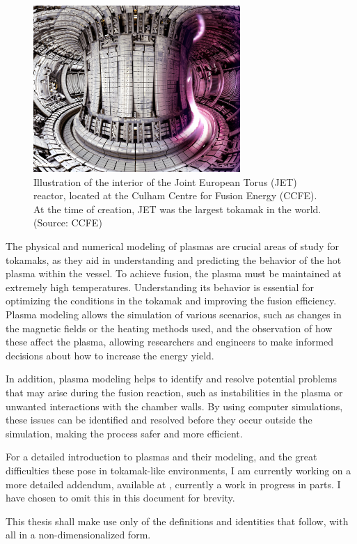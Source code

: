     \begin{figure}[!ht]
        \centering
        \includegraphics[width = 0.7\textwidth]{0 - introduction/images/JET.jpg}
        \caption{Illustration of the interior of the Joint European Torus (JET) reactor, located at the Culham Centre for Fusion Energy (CCFE). At the time of creation, JET was the largest tokamak in the world. (Source: CCFE)}
    \end{figure}

    \shortline

    The physical and numerical modeling of plasmas are crucial areas of study for tokamaks, as they aid in understanding and predicting the behavior of the hot plasma within the vessel. To achieve fusion, the plasma must be maintained at extremely high temperatures. Understanding its behavior is essential for optimizing the conditions in the tokamak and improving the fusion efficiency. Plasma modeling allows the simulation of various scenarios, such as changes in the magnetic fields or the heating methods used, and the observation of how these affect the plasma, allowing researchers and engineers to make informed decisions about how to increase the energy yield.

    In addition, plasma modeling helps to identify and resolve potential problems that may arise during the fusion reaction, such as instabilities in the plasma or unwanted interactions with the chamber walls. By using computer simulations, these issues can be identified and resolved before they occur outside the simulation, making the process safer and more efficient.
    
    \shortline

    \begin{remark}[Addendum]
        For a detailed introduction to plasmas and their modeling, and the great difficulties these pose in tokamak-like environments, I am currently working on a more detailed addendum, available at \cite{addendum}, currently a work in progress in parts. I have chosen to omit this in this document for brevity.
        
        This thesis shall make use only of the definitions and identities that follow, with all in a non-dimensionalized form.
    \end{remark}

